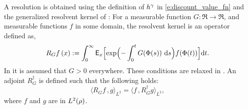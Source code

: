 A resolution is obtained using the definition of $h^\gamma$ in \eqref{e:discount_value_fn} and the generalized resolvent kernel of \cite{nev72,meytwe93e,devkonmey17a}: For a measurable function $G\colon\Re\to\Re$, and measurable functions $f$ in some domain, the resolvent kernel is an operator defined as,
\begin{equation}
R_G f\, (x) := \int_0^\infty \Expect_x\Bigl[ \exp\Bigl(-\int_0^t G(\process(s))\, \rmd s \Bigr) f(\process(t))\Bigr] \ud t.
\label{e:resolvent_neveu}
\end{equation}
In  \cite{nev72,meytwe93e} it is assumed that $G>0$ everywhere. These conditions are relaxed in \cite{konmey03a,devkonmey17a}. An adjoint $R^\dagger_G$ is defined such that the following holds:
\[
\langle R_G f \, , g \rangle_{L^2} = \langle f \, , R^\dagger_G g \rangle_{L^2}, 
\]
where $f$ and $g$ are in $L^2(\rho)$. 

